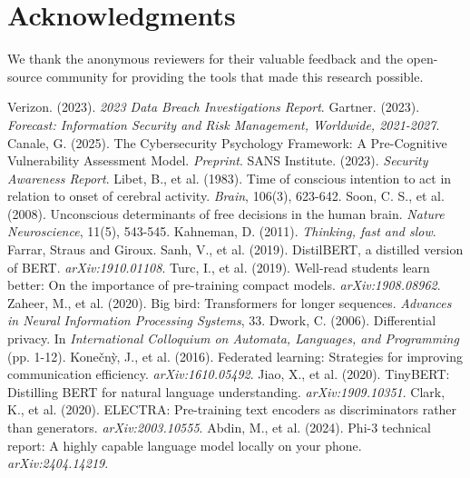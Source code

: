 \documentclass[11pt,a4paper]{article}
\begin{document}
\section*{Acknowledgments}
We thank the anonymous reviewers for their valuable feedback and the open-source community for providing the tools that made this research possible.

\begin{thebibliography}{99}
 Verizon. (2023). \textit{2023 Data Breach Investigations Report}.
 Gartner. (2023). \textit{Forecast: Information Security and Risk Management, Worldwide, 2021-2027}.
 Canale, G. (2025). The Cybersecurity Psychology Framework: A Pre-Cognitive Vulnerability Assessment Model. \textit{Preprint}.
 SANS Institute. (2023). \textit{Security Awareness Report}.
 Libet, B., et al. (1983). Time of conscious intention to act in relation to onset of cerebral activity. \textit{Brain}, 106(3), 623-642.
 Soon, C. S., et al. (2008). Unconscious determinants of free decisions in the human brain. \textit{Nature Neuroscience}, 11(5), 543-545.
 Kahneman, D. (2011). \textit{Thinking, fast and slow}. Farrar, Straus and Giroux.
 Sanh, V., et al. (2019). DistilBERT, a distilled version of BERT. \textit{arXiv:1910.01108}.
 Turc, I., et al. (2019). Well-read students learn better: On the importance of pre-training compact models. \textit{arXiv:1908.08962}.
 Zaheer, M., et al. (2020). Big bird: Transformers for longer sequences. \textit{Advances in Neural Information Processing Systems}, 33.
 Dwork, C. (2006). Differential privacy. In \textit{International Colloquium on Automata, Languages, and Programming} (pp. 1-12).
 Konečnỳ, J., et al. (2016). Federated learning: Strategies for improving communication efficiency. \textit{arXiv:1610.05492}.
 Jiao, X., et al. (2020). TinyBERT: Distilling BERT for natural language understanding. \textit{arXiv:1909.10351}.
 Clark, K., et al. (2020). ELECTRA: Pre-training text encoders as discriminators rather than generators. \textit{arXiv:2003.10555}.
 Abdin, M., et al. (2024). Phi-3 technical report: A highly capable language model locally on your phone. \textit{arXiv:2404.14219}.
\end{thebibliography}
\end{document}
